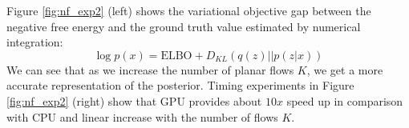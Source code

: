 Figure \ref{fig:nf_exp2} (left) shows the variational objective gap between the negative free energy and the ground truth value estimated by numerical integration:
\begin{equation}
    \log p(x) = \mathrm{ELBO} + D_{KL}(q(z)||p(z|x))
\end{equation}
We can see that as we increase the number of planar flows $K$, we get a more accurate representation of the posterior. Timing experiments in Figure \ref{fig:nf_exp2} (right) show that GPU provides about $10x$ speed up in comparison with CPU and linear increase with the number of flows $K$. 







